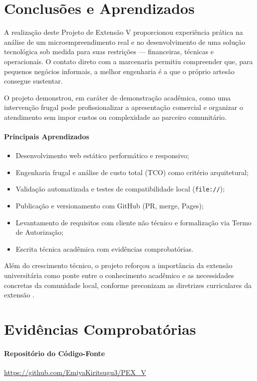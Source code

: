 \documentclass[12pt,a4paper]{article}
\begin{document}
\section{Conclusões e Aprendizados}

A realização deste Projeto de Extensão V proporcionou experiência prática na análise de um microempreendimento real e no desenvolvimento de uma solução tecnológica sob medida para suas restrições --- financeiras, técnicas e operacionais. O contato direto com a marcenaria permitiu compreender que, para pequenos negócios informais, a melhor engenharia é a que o próprio artesão consegue sustentar.

O projeto demonstrou, em caráter de demonstração acadêmica, como uma intervenção frugal pode profissionalizar a apresentação comercial e organizar o atendimento sem impor custos ou complexidade ao parceiro comunitário.

\paragraph{Principais Aprendizados}
\begin{itemize}[leftmargin=*]
\item Desenvolvimento web estático performático e responsivo;
\item Engenharia frugal e análise de custo total (TCO) como critério arquitetural;
\item Validação automatizada e testes de compatibilidade local (\texttt{file://});
\item Publicação e versionamento com GitHub (PR, merge, Pages);
\item Levantamento de requisitos com cliente não técnico e formalização via Termo de Autorização;
\item Escrita técnica acadêmica com evidências comprobatórias.
\end{itemize}

Além do crescimento técnico, o projeto reforçou a importância da extensão universitária como ponte entre o conhecimento acadêmico e as necessidades concretas da comunidade local, conforme preconizam as diretrizes curriculares da extensão \cite{resolucao2018}.



\section{Evidências Comprobatórias}

\paragraph{Repositório do Código-Fonte}
\url{https://github.com/EmiyaKiritsugu3/PEX_V}
\end{document}
